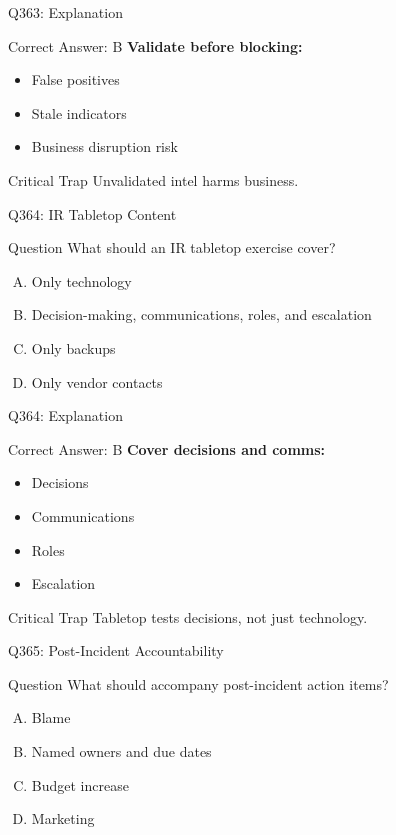 \documentclass{beamer}
\begin{document}
	\begin{frame}{Q363: Explanation}
		\begin{block}{Correct Answer: B}
			\textbf{Validate before blocking:}
			\begin{itemize}
				\item False positives
				\item Stale indicators
				\item Business disruption risk
			\end{itemize}
		\end{block}
		\begin{alertblock}{Critical Trap}
			Unvalidated intel harms business.
		\end{alertblock}
	\end{frame}
	
	\begin{frame}{Q364: IR Tabletop Content}
		\begin{block}{Question}
			What should an IR tabletop exercise cover?
		\end{block}
		\begin{enumerate}[(A)]
			\item Only technology
			\item Decision-making, communications, roles, and escalation
			\item Only backups
			\item Only vendor contacts
		\end{enumerate}
	\end{frame}
	
	\begin{frame}{Q364: Explanation}
		\begin{block}{Correct Answer: B}
			\textbf{Cover decisions and comms:}
			\begin{itemize}
				\item Decisions
				\item Communications
				\item Roles
				\item Escalation
			\end{itemize}
		\end{block}
		\begin{alertblock}{Critical Trap}
			Tabletop tests decisions, not just technology.
		\end{alertblock}
	\end{frame}
	
	\begin{frame}{Q365: Post-Incident Accountability}
		\begin{block}{Question}
			What should accompany post-incident action items?
		\end{block}
		\begin{enumerate}[(A)]
			\item Blame
			\item Named owners and due dates
			\item Budget increase
			\item Marketing
		\end{enumerate}
	\end{frame}
	
\end{document}
